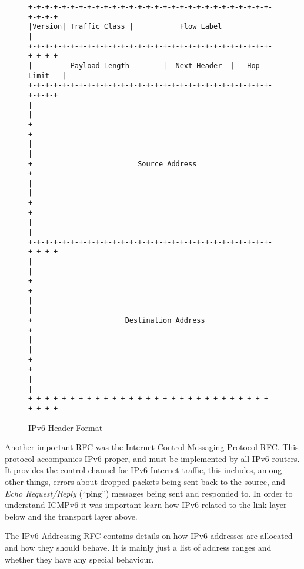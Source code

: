 \documentclass[12pt,a4paper,twoside,openany]{report}
\begin{document}
\begin{figure}
\centering
\begin{varwidth}{\linewidth}
\begin{verbatim}
+-+-+-+-+-+-+-+-+-+-+-+-+-+-+-+-+-+-+-+-+-+-+-+-+-+-+-+-+-+-+-+-+
|Version| Traffic Class |           Flow Label                  |
+-+-+-+-+-+-+-+-+-+-+-+-+-+-+-+-+-+-+-+-+-+-+-+-+-+-+-+-+-+-+-+-+
|         Payload Length        |  Next Header  |   Hop Limit   |
+-+-+-+-+-+-+-+-+-+-+-+-+-+-+-+-+-+-+-+-+-+-+-+-+-+-+-+-+-+-+-+-+
|                                                               |
+                                                               +
|                                                               |
+                         Source Address                        +
|                                                               |
+                                                               +
|                                                               |
+-+-+-+-+-+-+-+-+-+-+-+-+-+-+-+-+-+-+-+-+-+-+-+-+-+-+-+-+-+-+-+-+
|                                                               |
+                                                               +
|                                                               |
+                      Destination Address                      +
|                                                               |
+                                                               +
|                                                               |
+-+-+-+-+-+-+-+-+-+-+-+-+-+-+-+-+-+-+-+-+-+-+-+-+-+-+-+-+-+-+-+-+
\end{verbatim}
\end{varwidth}
\caption{IPv6 Header Format\cite{ipv6_rfc}}
\label{fig::ipv6_header}
\end{figure}

\bigskip

Another important RFC was the Internet Control Messaging Protocol RFC\cite{icmpv6_rfc}.  This protocol accompanies IPv6 proper, and must be implemented by all IPv6 routers.  It provides the control channel for IPv6 Internet traffic, this includes, among other things, errors about dropped packets being sent back to the source, and \textit{Echo Request/Reply} (``ping'') messages being sent and responded to.  In order to understand ICMPv6 it was important learn how IPv6 related to the link layer below and the transport layer above.

\bigskip

The IPv6 Addressing RFC\cite{ipv6_rfc_adr} contains details on how IPv6 addresses are allocated and how they should behave. It is mainly just a list of address ranges and whether they have any special behaviour.  
\end{document}
